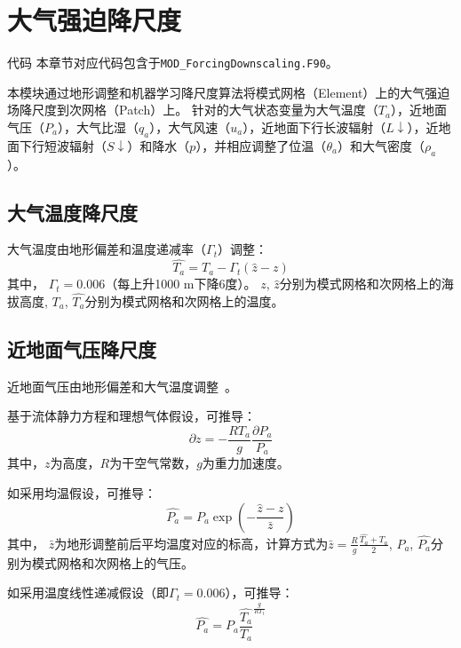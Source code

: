 \chapter{大气强迫降尺度}\label{大气强迫降尺度}
\begin{mymdframed}{代码}
本章节对应代码包含于\texttt{MOD\_ForcingDownscaling.F90}。
\end{mymdframed}

本模块通过地形调整和机器学习降尺度算法将模式网格（Element）上的大气强迫场降尺度到次网格（Patch）上。
针对的大气状态变量为大气温度（$T_{a}$），近地面气压（$P_{a}$），大气比湿（$q_{a}$），大气风速（$u_{a}$），近地面下行长波辐射（$L↓$），近地面下行短波辐射（$S↓$）和降水（$p$），并相应调整了位温（$\theta_{a}$）和大气密度（$\rho_{a}$）。

\section{大气温度降尺度}
大气温度由地形偏差和温度递减率（${\Gamma}_{t}$）调整：
\begin{equation}\label{T_atm}
\hat{T_{a}}=T_{a}-{\Gamma}_{t} \left(\hat{z}-z\right)
\end{equation}
其中，
${\Gamma}_{t}=0.006$（每上升1000 m下降6度）。
$z$, $\hat{z}$分别为模式网格和次网格上的海拔高度,
$T_{a}$, $\hat{T_{a}}$分别为模式网格和次网格上的温度。

\section{近地面气压降尺度}
近地面气压由地形偏差和大气温度调整~\citep{Cosgrove2003}。

基于流体静力方程和理想气体假设，可推导：
\begin{equation}
\partial z=-\frac{RT_{a}}{g}\frac{\partial P_{a}}{P_{a}}
\end{equation}
其中，$z$为高度，$R$为干空气常数，$g$为重力加速度。

如采用均温假设，可推导：
\begin{equation}
\hat{P_{a}}=P_{a} \exp{\left(-\frac{\hat{z}-z}{\bar{z}}\right)}
\end{equation}
其中，
$\bar{z}$为地形调整前后平均温度对应的标高，计算方式为$\bar{z}=\frac{R}{g} \frac{\hat{T_{a}}+T_{a}}{2}$,  
$P_{a}$, $\hat{P_{a}}$分别为模式网格和次网格上的气压。

如采用温度线性递减假设（即${\Gamma}_{t}=0.006$），可推导：
\begin{equation}
\hat{P_{a}}=P_{a} \frac{\hat{T_{a}}}{T_{a}}^\frac{g}{R\Gamma_{t}}
\end{equation}

